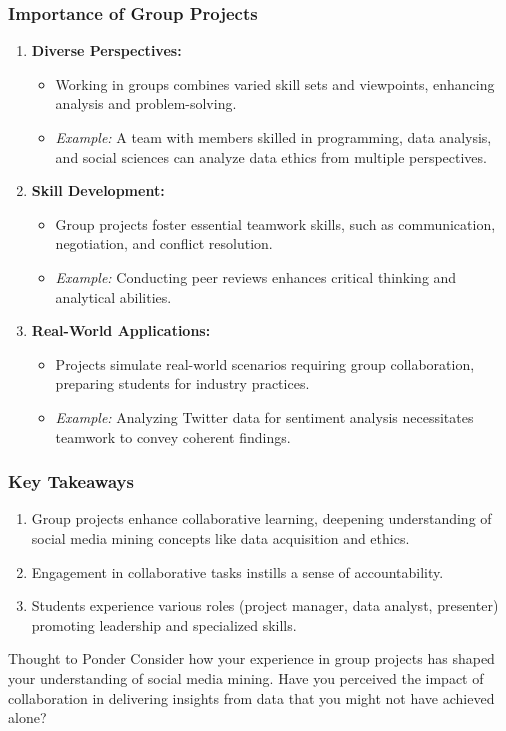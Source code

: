 \documentclass{beamer}
\begin{document}
\begin{frame}[fragile]
    \frametitle{Importance of Group Projects}
    \begin{enumerate}
        \item \textbf{Diverse Perspectives:}
            \begin{itemize}
                \item Working in groups combines varied skill sets and viewpoints, enhancing analysis and problem-solving.
                \item \textit{Example:} A team with members skilled in programming, data analysis, and social sciences can analyze data ethics from multiple perspectives.
            \end{itemize}

        \item \textbf{Skill Development:}
            \begin{itemize}
                \item Group projects foster essential teamwork skills, such as communication, negotiation, and conflict resolution.
                \item \textit{Example:} Conducting peer reviews enhances critical thinking and analytical abilities.
            \end{itemize}

        \item \textbf{Real-World Applications:}
            \begin{itemize}
                \item Projects simulate real-world scenarios requiring group collaboration, preparing students for industry practices.
                \item \textit{Example:} Analyzing Twitter data for sentiment analysis necessitates teamwork to convey coherent findings.
            \end{itemize}
    \end{enumerate}
\end{frame}

\begin{frame}[fragile]
    \frametitle{Key Takeaways}
    \begin{enumerate}
        \item Group projects enhance collaborative learning, deepening understanding of social media mining concepts like data acquisition and ethics.
        \item Engagement in collaborative tasks instills a sense of accountability.
        \item Students experience various roles (project manager, data analyst, presenter) promoting leadership and specialized skills.
    \end{enumerate}

    \begin{block}{Thought to Ponder}
        Consider how your experience in group projects has shaped your understanding of social media mining. 
        Have you perceived the impact of collaboration in delivering insights from data that you might not have achieved alone?
    \end{block}
\end{frame}
\end{document}
